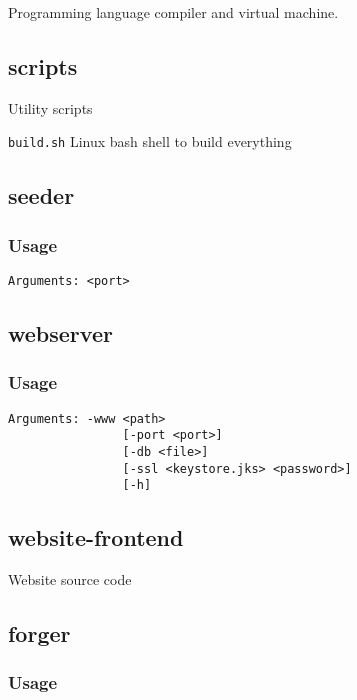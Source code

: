 \documentclass[../documentation.tex]{subfiles}
\begin{document}
Programming language compiler and virtual machine.

\subsection{scripts}

Utility scripts

\texttt{build.sh} Linux bash shell to build everything

\subsection{seeder}

\subsubsection{Usage}

\begin{lstlisting}[style=generic]
     Arguments: <port>
\end{lstlisting}

\subsection{webserver}

\subsubsection{Usage}

\begin{lstlisting}[style=generic]
     Arguments: -www <path>
                [-port <port>]
                [-db <file>]
                [-ssl <keystore.jks> <password>]
                [-h]
\end{lstlisting}

\subsection{website-frontend}

Website source code

\subsection{forger}

\subsubsection{Usage}
\end{document}
